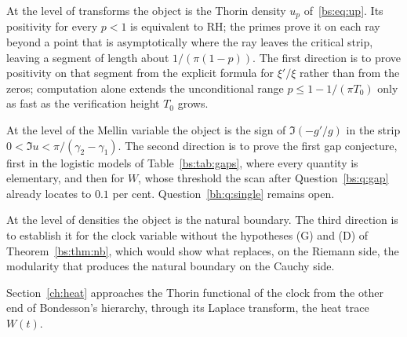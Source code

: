 At the level of transforms the object is the Thorin density $u_p$ of~\eqref{bs:eq:up}. Its positivity for every $p<1$ is equivalent to RH; the primes prove it on each ray beyond a point that is asymptotically where the ray leaves the critical strip, leaving a segment of length about $1/(\pi(1-p))$. The first direction is to prove positivity on that segment from the explicit formula for $\xi'/\xi$ rather than from the zeros; computation alone extends the unconditional range $p\le1-1/(\pi T_0)$ only as fast as the verification height $T_0$ grows.

At the level of the Mellin variable the object is the sign of $\Im(-g'/g)$ in the strip $0<\Im u<\pi/(\gamma_2-\gamma_1)$. The second direction is to prove the first gap conjecture, first in the logistic models of Table~\ref{bs:tab:gaps}, where every quantity is elementary, and then for $W$, whose threshold the scan after Question~\ref{bs:q:gap} already locates to $0.1$ per cent. Question~\ref{bh:q:single} remains open.

At the level of densities the object is the natural boundary. The third direction is to establish it for the clock variable without the hypotheses (G) and (D) of Theorem~\ref{bs:thm:nb}, which would show what replaces, on the Riemann side, the modularity that produces the natural boundary on the Cauchy side.

Section~\ref{ch:heat} approaches the Thorin functional of the clock from the other end of Bondesson's hierarchy, through its Laplace transform, the heat trace $W(t)$.
